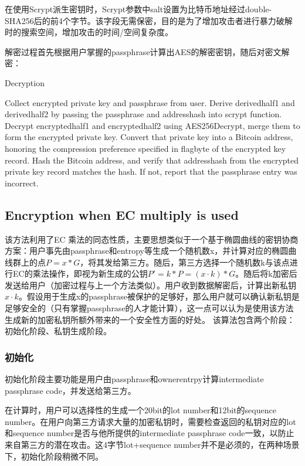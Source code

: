在使用Scrypt派生密钥时，Scrypt参数中salt设置为比特币地址经过double-SHA256后的前4个字节。该字段无需保密，目的是为了增加攻击者进行暴力破解时的搜索空间，增加攻击的时间/空间复杂度。



解密过程首先根据用户掌握的passphrase计算出AES的解密密钥，随后对密文解密：

\begin{algorithm}[tbp]\footnotesize
\caption{Decryption}
  	\begin{algorithmic}[1]
	    \STATE Collect encrypted private key and passphrase from user.  
		\STATE Derive derivedhalf1 and derivedhalf2 by passing the passphrase and addresshash into scrypt function.
		\STATE Decrypt encryptedhalf1 and encryptedhalf2 using AES256Decrypt, merge them to form the encrypted private key. 
		\STATE Convert that private key into a Bitcoin address, honoring the compression preference specified in flagbyte of the encrypted key record.
		\STATE Hash the Bitcoin address, and verify that addresshash from the encrypted private key record matches the hash. If not, report that the passphrase entry was incorrect.  
    \end{algorithmic}
\end{algorithm}


\subsection{Encryption when EC multiply is used}

该方法利用了EC 乘法的同态性质，主要思想类似于一个基于椭圆曲线的密钥协商方案：用户事先由passphrase和entropy等生成一个随机数x，并计算对应的椭圆曲线群上的点$P=x*G$，将其发给第三方。随后，第三方选择一个随机数k与该点进行EC的乘法操作，即视为新生成的公钥$P'=k*P=(x \cdot k)*G$。随后将k加密后发送给用户（加密过程与上一个方法类似）。用户收到数据解密后，计算出新私钥$x\cdot k$。假设用于生成x的passphrase被保护的足够好，那么用户就可以确认新私钥是足够安全的（只有掌握passphrase的人才能计算），这一点可以认为是使用该方法生成新的加密私钥所额外带来的一个安全性方面的好处。
该算法包含两个阶段：初始化阶段、私钥生成阶段。

\subsubsection{初始化}
初始化阶段主要功能是用户由passphrase和ownerentrpy计算intermediate passphrase code，并发送给第三方。  

在计算时，用户可以选择性的生成一个20bit的lot number和12bit的sequence number。在用户向第三方请求大量的加密私钥时，需要检查返回的私钥对应的lot和sequence number是否与他所提供的intermediate passphrase code一致，以防止来自第三方的潜在攻击。这4字节lot+sequence number并不是必须的，在两种场景下，初始化阶段稍微不同。 
 
